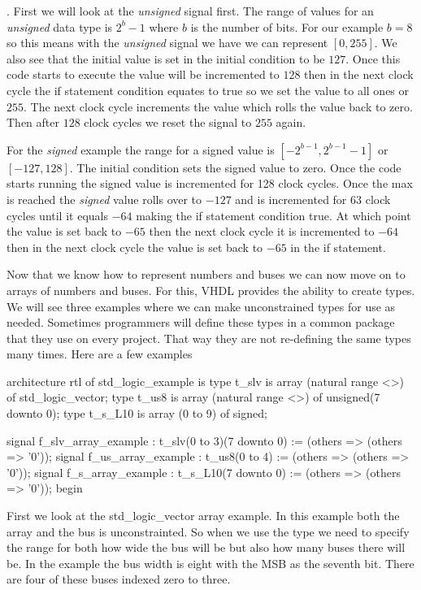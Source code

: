 . First we will look at the \emph{unsigned} signal first. The range of values for an \emph{unsigned} data type is $2^b-1$ where $b$ is the number of bits. For our example $b=8$ so this means with the \emph{unsigned} signal we have we can represent $[0,255]$. We also see that the initial value is set in the initial condition to be $127$. Once this code starts to execute the value will be incremented to $128$ then in the next clock cycle the if statement condition equates to true so we set the value to all ones or $255$. The next clock cycle increments the value which rolls the value back to zero. Then after $128$ clock cycles we reset the signal to $255$ again. 

For the \emph{signed} example the range for a signed value is $[-2^{b-1},2^{b-1}-1]$ or $[-127,128]$. The initial condition sets the signed value to zero. Once the code starts running the signed value is incremented for 128 clock cycles. Once the max is reached the \emph{signed} value rolls over to $-127$ and is incremented for $63$ clock cycles until it equals $-64$ making the if statement condition true. At which point the value is set back to $-65$ then the next clock cycle it is incremented to $-64$ then in the next clock cycle the value is set back to $-65$ in the if statement. 

Now that we know how to represent numbers and buses we can now move on to arrays of numbers and buses. For this, \ac{VHDL} provides the ability to create types. We will see three examples where we can make unconstrained types for use as needed. Sometimes programmers will define these types in a common package that they use on every project. That way they are not re-defining the same types many times. Here are a few examples

\begin{VHDLlisting}[tabsize=4]
architecture rtl of std_logic_example is
   type t_slv is array (natural range <>) of std_logic_vector;
   type t_us8 is array (natural range <>) of unsigned(7 downto 0);
   type t_s_L10 is array (0 to 9) of signed;
   
   signal f_slv_array_example : t_slv(0 to 3)(7 downto 0) := (others => (others => '0'));
   signal f_us_array_example  : t_us8(0 to 4)             := (others => (others => '0'));
   signal f_s_array_example   : t_s_L10(7 downto 0)       := (others => (others => '0'));
begin
\end{VHDLlisting}

First we look at the std\_logic\_vector array example. In this example both the array and the bus is unconstrainted. So when we use the type we need to specify the range for both how wide the bus will be but also how many buses there will be. In the example the bus width is eight with the \ac{MSB} as the seventh bit. There are four of these buses indexed zero to three. 

